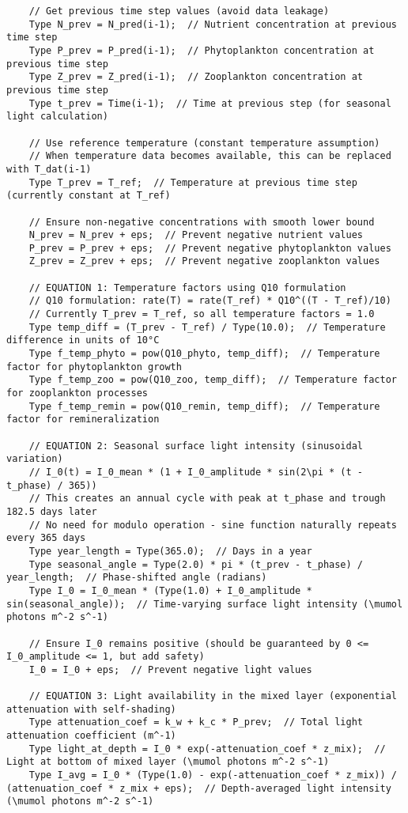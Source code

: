 \begin{lstlisting}
    // Get previous time step values (avoid data leakage)
    Type N_prev = N_pred(i-1);  // Nutrient concentration at previous time step
    Type P_prev = P_pred(i-1);  // Phytoplankton concentration at previous time step
    Type Z_prev = Z_pred(i-1);  // Zooplankton concentration at previous time step
    Type t_prev = Time(i-1);  // Time at previous step (for seasonal light calculation)
    
    // Use reference temperature (constant temperature assumption)
    // When temperature data becomes available, this can be replaced with T_dat(i-1)
    Type T_prev = T_ref;  // Temperature at previous time step (currently constant at T_ref)
    
    // Ensure non-negative concentrations with smooth lower bound
    N_prev = N_prev + eps;  // Prevent negative nutrient values
    P_prev = P_prev + eps;  // Prevent negative phytoplankton values
    Z_prev = Z_prev + eps;  // Prevent negative zooplankton values
    
    // EQUATION 1: Temperature factors using Q10 formulation
    // Q10 formulation: rate(T) = rate(T_ref) * Q10^((T - T_ref)/10)
    // Currently T_prev = T_ref, so all temperature factors = 1.0
    Type temp_diff = (T_prev - T_ref) / Type(10.0);  // Temperature difference in units of 10°C
    Type f_temp_phyto = pow(Q10_phyto, temp_diff);  // Temperature factor for phytoplankton growth
    Type f_temp_zoo = pow(Q10_zoo, temp_diff);  // Temperature factor for zooplankton processes
    Type f_temp_remin = pow(Q10_remin, temp_diff);  // Temperature factor for remineralization
    
    // EQUATION 2: Seasonal surface light intensity (sinusoidal variation)
    // I_0(t) = I_0_mean * (1 + I_0_amplitude * sin(2\pi * (t - t_phase) / 365))
    // This creates an annual cycle with peak at t_phase and trough 182.5 days later
    // No need for modulo operation - sine function naturally repeats every 365 days
    Type year_length = Type(365.0);  // Days in a year
    Type seasonal_angle = Type(2.0) * pi * (t_prev - t_phase) / year_length;  // Phase-shifted angle (radians)
    Type I_0 = I_0_mean * (Type(1.0) + I_0_amplitude * sin(seasonal_angle));  // Time-varying surface light intensity (\mumol photons m^-2 s^-1)
    
    // Ensure I_0 remains positive (should be guaranteed by 0 <= I_0_amplitude <= 1, but add safety)
    I_0 = I_0 + eps;  // Prevent negative light values
    
    // EQUATION 3: Light availability in the mixed layer (exponential attenuation with self-shading)
    Type attenuation_coef = k_w + k_c * P_prev;  // Total light attenuation coefficient (m^-1)
    Type light_at_depth = I_0 * exp(-attenuation_coef * z_mix);  // Light at bottom of mixed layer (\mumol photons m^-2 s^-1)
    Type I_avg = I_0 * (Type(1.0) - exp(-attenuation_coef * z_mix)) / (attenuation_coef * z_mix + eps);  // Depth-averaged light intensity (\mumol photons m^-2 s^-1)
    

\end{lstlisting}

